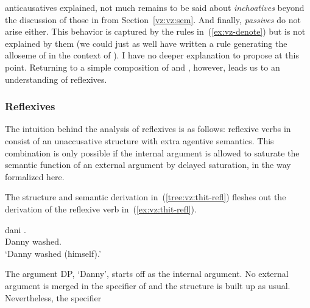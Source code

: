 \begin{exe}
\begin{xlist}
\begin{xlist}
\begin{exe}
\begin{xlist}
\begin{xlist}
\begin{exe}
\begin{xlist}
\begin{xlist}
\begin{exe}
\begin{exe}
\begin{xlist}
\begin{exe}
\begin{exe}
\begin{xlist}
\begin{exe}
\begin{exe}
\begin{exe}
\begin{exe}
\begin{exe}
\begin{xlist}
\begin{exe}
\begin{xlist}
\begin{exe}
\begin{exe}
\begin{xlist}
\begin{exe}
\begin{xlist}
\begin{exe}
\begin{xlist}
\begin{exe}
\begin{exe}
\begin{exe}
\begin{xlist}
\begin{exe}
\begin{exe}
\begin{exe}
\begin{xlist}
\begin{exe}
\begin{xlist}
\begin{exe}
\begin{xlist}
\begin{exe}
\begin{xlist}
\begin{exe}
\begin{exe}
\begin{exe}
\begin{exe}
\begin{xlist}
\begin{exe}
\begin{xlist}
\begin{exe}
\begin{xlist}
\begin{exe}
\begin{xlist}
\begin{exe}
\begin{xlist}
\begin{exe}
\begin{xlist}
\begin{exe}
\begin{exe}
\begin{exe}
\begin{exe}
\begin{xlist}
\begin{exe}
\begin{xlist}
\begin{exe}
\begin{xlist}
\begin{exe}
\begin{exe}
\begin{xlist}
\begin{exe}
\begin{xlist}
\begin{exe}
\begin{exe}
\begin{exe}
\begin{exe}
\begin{xlist}
\begin{xlist}
\begin{exe}
\begin{xlist}
\begin{exe}
\begin{exe}
\begin{exe}
\begin{xlist}
\begin{exe}
\begin{exe}
\begin{xlist}
\begin{exe}
\begin{exe}
\begin{exe}
\begin{xlist}
\begin{xlist}
\begin{exe}
\begin{xlist}
\begin{exe}
\begin{exe}
\begin{exe}
\begin{exe}
\begin{xlist}
\begin{exe}
\begin{xlist}
\begin{exe}
\begin{xlist}
\begin{exe}
\begin{xlist}
\begin{exe}
\begin{exe}
anticausatives explained, not much remains to be said about \textit{inchoatives} beyond the discussion of those in {\tnif} from Section~\ref{vz:vz:sem}. And finally, \textit{passives} do not arise either. This behavior is captured by the rules in~(\ref{ex:vz-denote}) but is not explained by them (we could just as well have written a rule generating the  alloseme of {\vz} in the context of {\va}). I have no deeper explanation to propose at this point. Returning to a simple composition of {\vz} and {\va}, however, leads us to an understanding of reflexives.

		\subsubsection{Reflexives} \label{vz:va:vzva:refl}
The intuition behind the analysis of reflexives is as follows: reflexive verbs in {\thit} consist of an unaccusative structure with extra agentive semantics. This combination is only possible if the internal argument is allowed to saturate the semantic function of an external argument by delayed saturation, in the way formalized here.

The structure and semantic derivation in~(\ref{tree:vz:thit-refl}) fleshes out the derivation of the reflexive verb in~(\ref{ex:vz:thit-refl}).
 \begin{exe}
\ex  \label{ex:vz:thit-refl} 
{ \gll dani .\\
   Danny washed.\\
 \glt `Danny washed (himself).' } 

 \z 

The argument DP, `Danny', starts off as the internal argument. No external argument is merged in the specifier of {\vz} and the structure is built up as usual. Nevertheless, the specifier 
\end{exe}
\end{exe}
\end{exe}
\end{xlist}
\end{exe}
\end{xlist}
\end{exe}
\end{xlist}
\end{exe}
\end{xlist}
\end{exe}
\end{exe}
\end{exe}
\end{exe}
\end{xlist}
\end{exe}
\end{xlist}
\end{xlist}
\end{exe}
\end{exe}
\end{exe}
\end{xlist}
\end{exe}
\end{exe}
\end{xlist}
\end{exe}
\end{exe}
\end{exe}
\end{xlist}
\end{exe}
\end{xlist}
\end{xlist}
\end{exe}
\end{exe}
\end{exe}
\end{exe}
\end{xlist}
\end{exe}
\end{xlist}
\end{exe}
\end{exe}
\end{xlist}
\end{exe}
\end{xlist}
\end{exe}
\end{xlist}
\end{exe}
\end{exe}
\end{exe}
\end{exe}
\end{xlist}
\end{exe}
\end{xlist}
\end{exe}
\end{xlist}
\end{exe}
\end{xlist}
\end{exe}
\end{xlist}
\end{exe}
\end{xlist}
\end{exe}
\end{exe}
\end{exe}
\end{exe}
\end{xlist}
\end{exe}
\end{xlist}
\end{exe}
\end{xlist}
\end{exe}
\end{xlist}
\end{exe}
\end{exe}
\end{exe}
\end{xlist}
\end{exe}
\end{exe}
\end{exe}
\end{xlist}
\end{exe}
\end{xlist}
\end{exe}
\end{xlist}
\end{exe}
\end{exe}
\end{xlist}
\end{exe}
\end{xlist}
\end{exe}
\end{exe}
\end{exe}
\end{exe}
\end{exe}
\end{xlist}
\end{exe}
\end{exe}
\end{xlist}
\end{exe}
\end{exe}
\end{xlist}
\end{xlist}
\end{exe}
\end{xlist}
\end{xlist}
\end{exe}
\end{xlist}
\end{xlist}
\end{exe}

